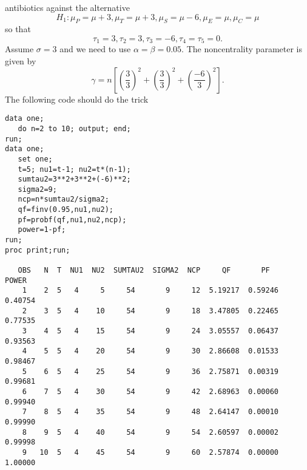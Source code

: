 antibiotics against the alternative
$$H_1: \mu_P=\mu+3, \mu_T=\mu+3,\mu_S=\mu-6,\mu_E=\mu,\mu_C=\mu$$
so that
$$ \tau_1=3, \tau_2=3, \tau_3=-6, \tau_4=\tau_5=0.$$
Assume $\sigma=3$ and we need to use $\alpha=\beta=0.05$.
\bigkn
The noncentrality parameter is given by
$$ \gamma=n [(\frac{3}{3})^2 + (\frac{3}{3})^2 +(\frac{-6}{3})^2].$$ 
The following code should do the trick
\begin{large}
\begin{verbatim}
data one;
   do n=2 to 10; output; end;
run;
data one;
   set one;
   t=5; nu1=t-1; nu2=t*(n-1);
   sumtau2=3**2+3**2+(-6)**2;
   sigma2=9;
   ncp=n*sumtau2/sigma2;
   qf=finv(0.95,nu1,nu2);
   pf=probf(qf,nu1,nu2,ncp);
   power=1-pf;
run;
proc print;run;

   OBS   N  T  NU1  NU2  SUMTAU2  SIGMA2  NCP     QF       PF     POWER
    1    2  5   4     5     54       9     12  5.19217  0.59246  0.40754
    2    3  5   4    10     54       9     18  3.47805  0.22465  0.77535
    3    4  5   4    15     54       9     24  3.05557  0.06437  0.93563
    4    5  5   4    20     54       9     30  2.86608  0.01533  0.98467
    5    6  5   4    25     54       9     36  2.75871  0.00319  0.99681
    6    7  5   4    30     54       9     42  2.68963  0.00060  0.99940
    7    8  5   4    35     54       9     48  2.64147  0.00010  0.99990
    8    9  5   4    40     54       9     54  2.60597  0.00002  0.99998
    9   10  5   4    45     54       9     60  2.57874  0.00000  1.00000
\end{verbatim}
\end{large}









